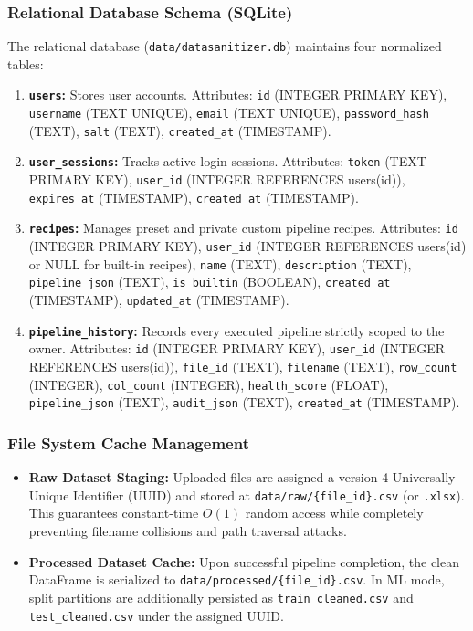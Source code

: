 \subsubsection{Relational Database Schema (SQLite)}
The relational database (\texttt{data/datasanitizer.db}) maintains four normalized tables:
\begin{enumerate}
  \item \textbf{\texttt{users}:} Stores user accounts. Attributes: \texttt{id} (INTEGER PRIMARY KEY), \texttt{username} (TEXT UNIQUE), \texttt{email} (TEXT UNIQUE), \texttt{password\_hash} (TEXT), \texttt{salt} (TEXT), \texttt{created\_at} (TIMESTAMP).
  \item \textbf{\texttt{user\_sessions}:} Tracks active login sessions. Attributes: \texttt{token} (TEXT PRIMARY KEY), \texttt{user\_id} (INTEGER REFERENCES users(id)), \texttt{expires\_at} (TIMESTAMP), \texttt{created\_at} (TIMESTAMP).
  \item \textbf{\texttt{recipes}:} Manages preset and private custom pipeline recipes. Attributes: \texttt{id} (INTEGER PRIMARY KEY), \texttt{user\_id} (INTEGER REFERENCES users(id) or NULL for built-in recipes), \texttt{name} (TEXT), \texttt{description} (TEXT), \texttt{pipeline\_json} (TEXT), \texttt{is\_builtin} (BOOLEAN), \texttt{created\_at} (TIMESTAMP), \texttt{updated\_at} (TIMESTAMP).
  \item \textbf{\texttt{pipeline\_history}:} Records every executed pipeline strictly scoped to the owner. Attributes: \texttt{id} (INTEGER PRIMARY KEY), \texttt{user\_id} (INTEGER REFERENCES users(id)), \texttt{file\_id} (TEXT), \texttt{filename} (TEXT), \texttt{row\_count} (INTEGER), \texttt{col\_count} (INTEGER), \texttt{health\_score} (FLOAT), \texttt{pipeline\_json} (TEXT), \texttt{audit\_json} (TEXT), \texttt{created\_at} (TIMESTAMP).
\end{enumerate}

\subsubsection{File System Cache Management}
\begin{itemize}
  \item \textbf{Raw Dataset Staging:} Uploaded files are assigned a version-4 Universally Unique Identifier (UUID) and stored at \texttt{data/raw/\{file\_id\}.csv} (or \texttt{.xlsx}). This guarantees constant-time $O(1)$ random access while completely preventing filename collisions and path traversal attacks.
  \item \textbf{Processed Dataset Cache:} Upon successful pipeline completion, the clean DataFrame is serialized to \texttt{data/processed/\{file\_id\}.csv}. In ML mode, split partitions are additionally persisted as \texttt{train\_cleaned.csv} and \texttt{test\_cleaned.csv} under the assigned UUID.
\end{itemize}

